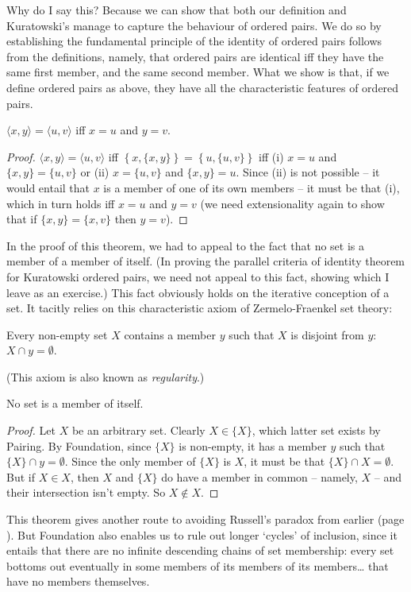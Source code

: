 Why do I say this? Because we can show that both our definition and Kuratowski's manage to capture the behaviour of  ordered pairs. We do so by establishing the fundamental principle of the identity of ordered pairs follows from the definitions, namely, that ordered pairs are identical iff they have the same first member, and the same second member. What we show is that, if we define ordered pairs as above, they have all the characteristic features of ordered pairs.
\begin{theorem}\label{cridorpa}
$\langle x,y\rangle = \langle u,v\rangle$ iff $x=u$ and $y=v$.
\begin{proof}
	$\langle x,y\rangle = \langle u,v\rangle$ iff $\left\{x,\{x,y\}\right\} = \left\{u,\{u,v\}\right\}$ iff (i) $x=u$ and $\{x,y\} = \{u,v\}$ or (ii) $x=\{u,v\}$ and $\{x,y\}=u$. Since (ii) is not possible – it would entail that $x$ is a member of one of its own members – it must be that (i), which in turn holds iff $x=u$ and $y=v$ (we need extensionality again to show that if $\{x,y\}=\{x,v\}$ then $y=v$).
\end{proof}
\end{theorem}
In the proof of this theorem, we had to appeal to the fact that no set is a member of a member of itself. (In proving the parallel criteria of identity theorem for Kuratowski ordered pairs, we need not appeal to this fact, showing which I leave as an exercise.) This fact obviously holds on the iterative conception of a set. It tacitly relies on this characteristic axiom of Zermelo-Fraenkel set theory: \begin{axiom}[Foundation]
	 Every non-empty set $X$ contains a member $y$  such that $X$ is disjoint from $y$: $X \cap y = \emptyset$.
\end{axiom} (This axiom is also known as \emph{regularity}.) \begin{theorem}
	No set is a member of itself. \begin{proof}
		Let $X$ be an arbitrary set. Clearly $X \in \{X\}$, which latter set exists by Pairing. By Foundation, since $\{X\}$ is non-empty, it has a member $y$ such that $\{X\} \cap y = \emptyset$. Since the only member of $\{X\}$ is $X$, it must be that $\{X\} \cap X = \emptyset$. But if $X\in X$, then $X$ and $\{X\}$ do have a member in common – namely, $X$ – and their intersection isn't empty. So $X \notin X$.
	\end{proof} 
\end{theorem} This theorem gives another route to avoiding Russell's paradox from earlier (page \pageref{russ}). But Foundation also enables us to rule out longer `cycles' of inclusion, since it entails that there are no infinite descending chains of set membership: every set bottoms out eventually in some members of its members of its members… that have no members themselves.

